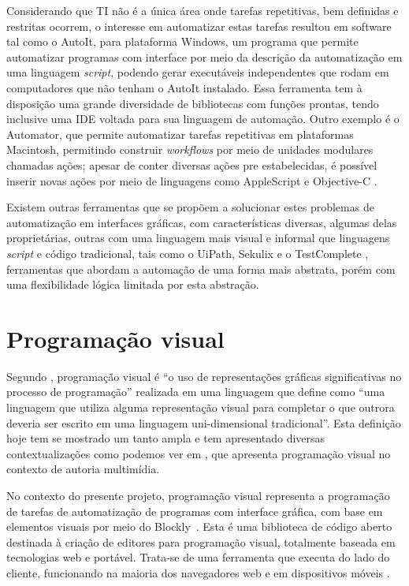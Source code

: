 \documentclass[tg]{mdtufsm}
\begin{document}
        	Considerando que TI não é a única área onde tarefas repetitivas, bem definidas e restritas ocorrem, o interesse em automatizar estas tarefas resultou em software tal como o AutoIt\cite{autoit}, para plataforma Windows, um programa que permite automatizar programas com interface por meio da descrição da automatização em uma linguagem \emph{script}, podendo gerar executáveis independentes que rodam em computadores que não tenham o AutoIt instalado. Essa ferramenta tem à disposição uma grande diversidade de bibliotecas com funções prontas, tendo inclusive uma IDE voltada para sua linguagem de automação. Outro exemplo é o Automator, que permite automatizar tarefas repetitivas em plataformas Macintosh, permitindo construir \emph{workflows} por meio de unidades modulares chamadas ações; apesar de conter diversas ações pre estabelecidas, é possível inserir novas ações por meio de linguagens como AppleScript e Objective-C \cite{automator}.

        	Existem outras ferramentas que se propõem a solucionar estes problemas de automatização em interfaces gráficas, com características diversas, algumas delas proprietárias, outras com uma linguagem mais visual e informal que linguagens \emph{script} e código tradicional, tais como o UiPath, Sekulix e o TestComplete \cite{uipath,testcomplete,sikuli}, ferramentas que abordam a automação de uma forma mais abstrata, porém com uma flexibilidade lógica limitada por esta abstração.

    	\section{Programação visual}

        	Segundo \citeauthor{visualProgram}\cite{visualProgram}, programação visual é ``o uso de representações gráficas significativas no processo de programação'' realizada em uma linguagem que \citeauthor{visualProgram} define como ``uma linguagem que utiliza alguma representação visual para completar o que outrora deveria ser escrito em uma linguagem uni-dimensional tradicional''. Esta definição hoje tem se mostrado um tanto ampla e tem apresentado diversas contextualizações como podemos ver em \cite{visualProgAuth}, que apresenta programação visual no contexto de autoria multimídia.

        	No contexto do presente projeto, programação visual representa a programação de tarefas de automatização de programas com interface gráfica, com base em elementos visuais por meio do Blockly~\cite{blocklyResource}. Esta é uma biblioteca de código aberto destinada à criação de editores para programação visual, totalmente baseada em tecnologias web e portável. Trata-se de uma ferramenta que executa do lado do cliente, funcionando na maioria dos navegadores web e em dispositivos móveis \cite{blocklyResource}.
\end{document}
